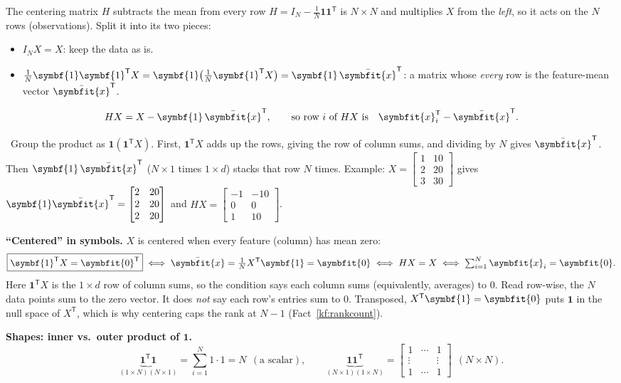 \documentclass[11pt]{article}
\newcommand{\bm}[1]{\symbfit{#1}}
\newcounter{keyfact}
\newcommand{\why}{\par\smallskip{\color{intgreen}\textbf{Why.}}\ }
\newcommand{\vx}{\bm{x}}
\newcommand{\one}{\symbf{1}}
\newcommand{\xbar}{\bar{\bm{x}}}
\newcommand{\T}{^{\mathsf T}}
\begin{document}
\begin{keyfactbox}{The centering matrix $H$ subtracts the mean from every row}\label{kf:centering}
$H=I_N-\tfrac1N\one\one\T$ is $N\times N$ and multiplies $X$ from the \emph{left}, so it acts on the $N$ rows
(observations). Split it into its two pieces:
\begin{itemize}[nosep]
\item $I_NX=X$: keep the data as is.
\item $\tfrac1N\one\one\T X=\one\big(\tfrac1N\one\T X\big)=\one\,\xbar\T$: a matrix whose \emph{every} row is the feature-mean vector $\xbar\T$.
\end{itemize}
\[
HX=X-\one\,\xbar\T,\qquad\text{so row $i$ of $HX$ is}\quad \vx_i\T-\xbar\T .
\]
\why Group the product as $\one(\one\T X)$. First, $\one\T X$ adds up the rows, giving the row of column
sums, and dividing by $N$ gives $\xbar\T$. Then $\one\,\xbar\T$ ($N\times1$ times $1\times d$) stacks that row $N$ times.
Example: $X=\begin{bmatrix}1&10\\2&20\\3&30\end{bmatrix}$ gives $\one\xbar\T=\begin{bmatrix}2&20\\2&20\\2&20\end{bmatrix}$ and
$HX=\begin{bmatrix}-1&-10\\0&0\\1&10\end{bmatrix}$.
\par\smallskip\textbf{``Centered'' in symbols.} $X$ is centered when every feature (column) has mean zero:
\[
\boxed{\one\T X=\bm0\T}\iff \xbar=\tfrac1NX\T\one=\bm0\iff HX=X\iff \textstyle\sum_{i=1}^N\vx_i=\bm0 .
\]
Here $\one\T X$ is the $1\times d$ row of column sums, so the condition says each column sums (equivalently, averages) to $0$.
Read row-wise, the $N$ data points sum to the zero vector. It does \emph{not} say each row's entries sum to $0$. Transposed,
$X\T\one=\bm0$ puts $\one$ in the null space of $X\T$, which is why centering caps the rank at $N-1$ (Fact~\ref{kf:rankcount}).
\par\smallskip\textbf{Shapes: inner vs.\ outer product of $\one$.}
\[
\underbrace{\one\T\one}_{(1\times N)(N\times1)}=\sum_{i=1}^N1\cdot1=N\ \ (\text{a scalar}),
\qquad
\underbrace{\one\one\T}_{(N\times1)(1\times N)}=\begin{bmatrix}1&\cdots&1\\\vdots&&\vdots\\1&\cdots&1\end{bmatrix}\ \ (N\times N).
\]
\end{keyfactbox}
\end{document}
